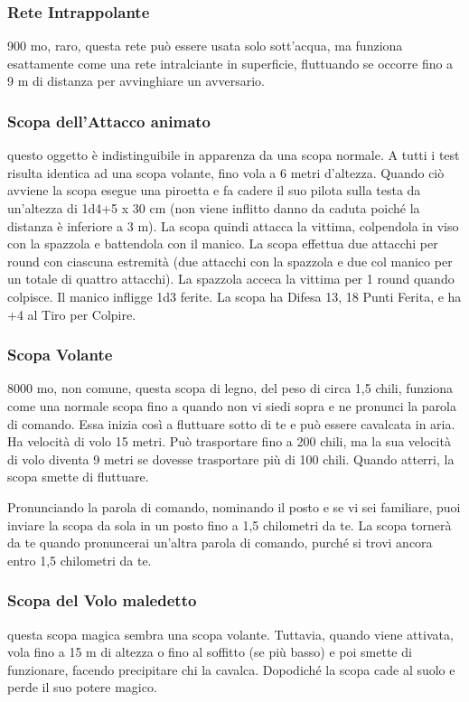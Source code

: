 \begin{multicols}{2}
\subsubsection*{Rete Intrappolante}
900 mo, raro, questa rete può essere usata solo sott'acqua, ma funziona esattamente come una rete intralciante in superficie, fluttuando se occorre fino a 9 m di distanza per avvinghiare un avversario.

\subsubsection*{Scopa dell’Attacco animato}
questo oggetto è indistinguibile in apparenza da una scopa normale. A tutti i test risulta identica ad una scopa volante, fino vola a 6 metri d'altezza. Quando ciò avviene la scopa esegue una piroetta e fa cadere il suo pilota sulla testa da un'altezza di 1d4+5 x 30 cm (non viene inflitto danno da caduta poiché la distanza è inferiore a 3 m). La scopa quindi attacca la vittima, colpendola in viso con la spazzola e battendola con il manico. La scopa effettua due attacchi per round con ciascuna estremità (due attacchi con la spazzola e due col manico per un totale di quattro attacchi). La spazzola acceca la vittima per 1 round quando colpisce. Il manico infligge 1d3 ferite. La scopa ha Difesa 13, 18 Punti Ferita, e ha +4 al Tiro per Colpire.

\subsubsection*{Scopa Volante}
8000 mo, non comune, questa scopa di legno, del peso di circa 1,5 chili, funziona come una normale scopa fino a quando non vi siedi sopra e ne pronunci la parola di comando. Essa inizia così a fluttuare sotto di te e può essere cavalcata in aria. Ha velocità di volo 15 metri. Può trasportare fino a 200 chili, ma la sua velocità di volo diventa 9 metri se dovesse trasportare più di 100 chili. Quando atterri, la scopa smette di fluttuare.

Pronunciando la parola di comando, nominando il posto e se vi sei familiare, puoi inviare la scopa da sola in un posto fino a 1,5 chilometri da te. La scopa tornerà da te quando pronuncerai un'altra parola di comando, purché si trovi ancora entro 1,5 chilometri da te.

\subsubsection*{Scopa del Volo maledetto}
questa scopa magica sembra una scopa volante. Tuttavia, quando viene attivata, vola fino a 15 m di altezza o fino al soffitto (se più basso) e poi smette di funzionare, facendo precipitare chi la cavalca. Dopodiché la scopa cade al suolo e perde il suo potere magico.


\end{multicols}
